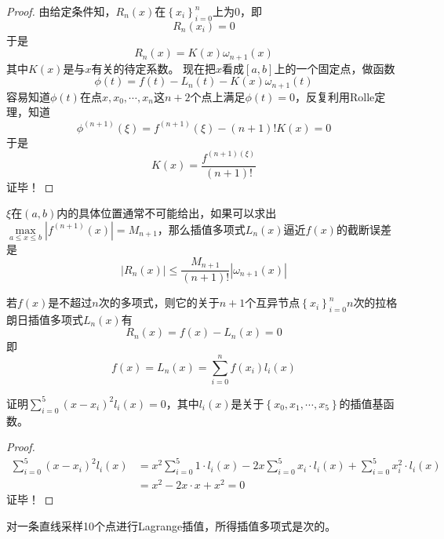 \begin{proof}
    由给定条件知，$R_n(x)$在$\left\{ x_i \right\}_{i = 0}^{n}$上为0，即
    \[
        R_n(x_i) = 0
    \]
    于是
    \[
        R_n(x) = K(x)\omega_{n+1}(x)
    \]
    其中$K(x)$是与$x$有关的待定系数。
    现在把$x$看成$\left[ a,b \right]$上的一个固定点，做函数
    \[
        \phi(t) = f(t)-L_n(t)-K(x)\omega_{n+1}(t)
    \]
    容易知道$\phi(t)$在点$x,x_0,\cdots,x_n$这$n+2$个点上满足$\phi(t) = 0$，反复利用Rolle定理，知道
    \[
        \phi^{(n+1)}(\xi) = f^{(n+1)}(\xi)-(n+1)!K(x) = 0
    \]
    于是
    \[
        K(x) = \dfrac{f^{(n+1)(\xi)}}{(n+1)!}
    \]
    证毕！
\end{proof}
\begin{remark}
    $\xi$在$(a,b)$内的具体位置通常不可能给出，如果可以求出$\max\limits_{a\leqslant x\leqslant b}|f^{(n+1)}(x)| = M_{n+1}$，那么插值多项式$L_n(x)$逼近$f(x)$的截断误差是
    \[
        |R_n(x)|\leqslant \dfrac{M_{n+1}}{(n+1)!}|\omega_{n+1}(x)|
    \]
\end{remark}
\begin{corollary}
    若$f(x)$是不超过$n$次的多项式，则它的关于$n+1$个互异节点$\left\{ x_i \right\}_{i = 0}^{n}$$n$次的拉格朗日插值多项式$L_{n}(x)$有
    \[
        R_{n}(x) = f(x)-L_{n}(x) = 0
    \]
    即
    \[
        f(x) = L_{n}(x) = \sum\limits_{i = 0}^{n}f(x_i)l_{i}(x)
    \]
\end{corollary}
\begin{example}
    证明$\sum\limits_{i = 0}^{5}\left( x-x_i \right)^2l_{i}(x) = 0$，其中$l_{i}(x)$是关于$\left\{ x_0,x_1,\cdots, x_5 \right\}$的插值基函数。
    \begin{proof}
        \[
            \begin{array}{ll}
                \sum\limits_{i = 0}^{5}\left( x-x_i \right)^2l_{i}(x) & = x^2\sum\limits_{i = 0}^{5}1\cdot l_{i}(x)-2x\sum\limits_{i = 0}^{5}x_i\cdot l_{i}(x)+\sum\limits_{i = 0}^{5}x_{i}^2\cdot l_{i}(x)\\
                &=x^2-2x\cdot x+x^2 = 0
            \end{array}
        \]
        证毕！
    \end{proof}    
\end{example}
\begin{example}
    对一条直线采样10个点进行Lagrange插值，所得插值多项式是次的。
\end{example}
